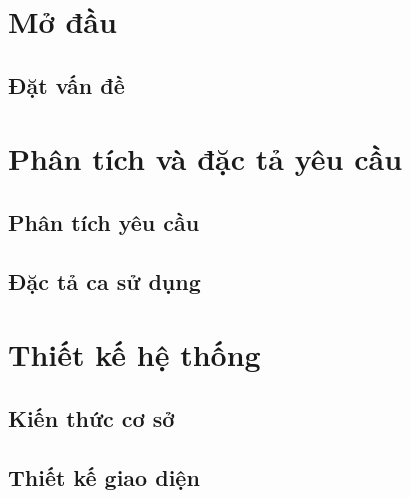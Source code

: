 \documentclass[12pt,a4paper]{report}
\begin{document}
\tableofcontents{}
\clearpage{}

\listoffigures{}

\listoftables{}

\chapter{Mở đầu}

\section{Đặt vấn đề}


\chapter{Phân tích và đặc tả yêu cầu}

\section{Phân tích yêu cầu}


\section{Đặc tả ca sử dụng}


\chapter{Thiết kế hệ thống}

\section{Kiến thức cơ sở}


% 

% 

\section{Thiết kế giao diện}

\end{document}
